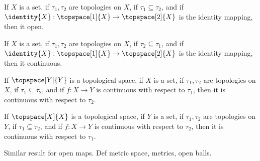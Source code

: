     \begin{theorem}
        If $X$ is a set, if $\tau_{1},\tau_{2}$ are topologies on $X$,
        if $\tau_{1}\subseteq\tau_{2}$, and if
        $\identity{X}:\topspace[1]{X}\rightarrow\topspace[2]{X}$ is the
        identity mapping, then it open.
    \end{theorem}
    \begin{theorem}
        If $X$ is a set, if $\tau_{1},\tau_{2}$ are topologies on $X$,
        if $\tau_{2}\subseteq\tau_{1}$, and if
        $\identity{X}:\topspace[1]{X}\rightarrow\topspace[2]{X}$ is the
        identity mapping, then it continuous.
    \end{theorem}
    \begin{theorem}
        If $\topspace[Y]{Y}$ is a topological space, if $X$ is a set, if
        $\tau_{1},\tau_{2}$ are topologies on $X$, if
        $\tau_{1}\subseteq\tau_{2}$, and if $f:X\rightarrow{Y}$ is
        continuous with respect to $\tau_{1}$, then it is continuous with
        respect to $\tau_{2}$.
    \end{theorem}
    \begin{theorem}
        If $\topspace[X]{X}$ is a topological space, if $Y$ is a set, if
        $\tau_{1},\tau_{2}$ are topologies on $Y$, if
        $\tau_{1}\subseteq\tau_{2}$, and if $f:X\rightarrow{Y}$ is
        continuous with respect to $\tau_{2}$, then it is continuous with
        respect to $\tau_{1}$.
    \end{theorem}
    Similar result for open maps. Def metric space, metrics, open balls.
